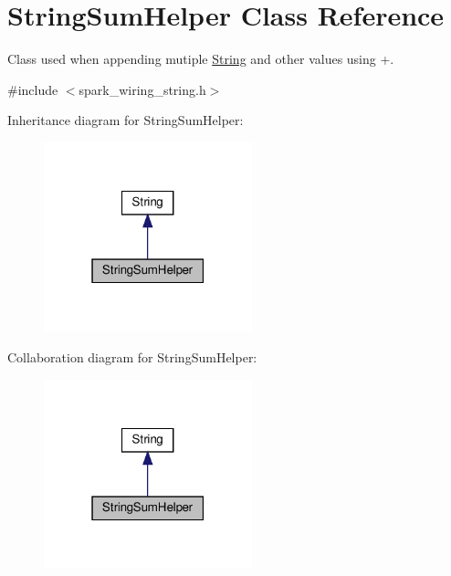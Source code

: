 \hypertarget{class_string_sum_helper}{}\section{String\+Sum\+Helper Class Reference}
\label{class_string_sum_helper}


Class used when appending mutiple \hyperlink{class_string}{String} and other values using +.  




{\ttfamily \#include $<$spark\+\_\+wiring\+\_\+string.\+h$>$}



Inheritance diagram for String\+Sum\+Helper\+:\nopagebreak
\begin{figure}[H]
\begin{center}
\leavevmode
\includegraphics[width=171pt]{class_string_sum_helper__inherit__graph}
\end{center}
\end{figure}


Collaboration diagram for String\+Sum\+Helper\+:\nopagebreak
\begin{figure}[H]
\begin{center}
\leavevmode
\includegraphics[width=171pt]{class_string_sum_helper__coll__graph}
\end{center}
\end{figure}
